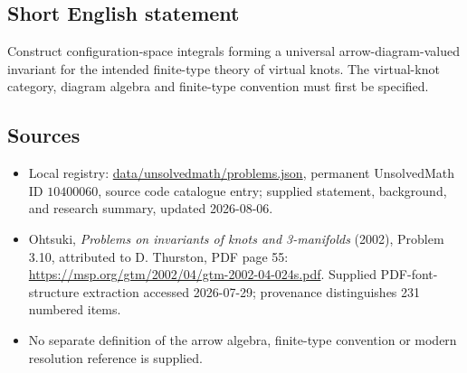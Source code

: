 \documentclass[11pt]{article}
\begin{document}
\subsection{Short English statement}
Construct configuration-space integrals forming a universal arrow-diagram-valued invariant for the intended finite-type theory of virtual knots. The virtual-knot category, diagram algebra and finite-type convention must first be specified.
\subsection{Sources}
\begin{itemize}
\item Local registry: \url{data/unsolvedmath/problems.json}, permanent UnsolvedMath ID \(10400060\), source code catalogue entry; supplied statement, background, and research summary, updated 2026-08-06.
\item Ohtsuki, \emph{Problems on invariants of knots and 3-manifolds} (2002), Problem 3.10, attributed to D. Thurston, PDF page 55: \url{https://msp.org/gtm/2002/04/gtm-2002-04-024s.pdf}. Supplied PDF-font-structure extraction accessed 2026-07-29; provenance distinguishes 231 numbered items.
\item No separate definition of the arrow algebra, finite-type convention or modern resolution reference is supplied.
\end{itemize}
\end{document}

